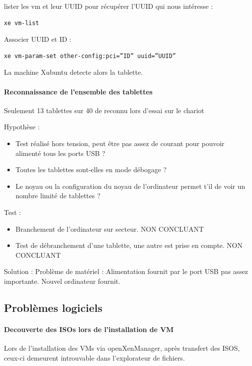 \documentclass[a4paper,12pt]{extarticle}
\begin{document}
lister les vm et leur UUID pour récupérer l’UUID qui nous intéresse :
\begin{verbatim}
xe vm-list
\end{verbatim}

Associer UUID et ID :
\begin{verbatim}
xe vm-param-set other-config:pci=”ID” uuid=”UUID”
\end{verbatim}
La machine Xubuntu detecte alors la tablette.



\paragraph{Reconnaissance de l'ensemble des tablettes\\}
Seulement 13 tablettes sur 40 de reconnu lors d'essai sur le chariot

Hypothèse :
\begin{itemize}
\item Test réalisé hors tension, peut être pas assez de courant pour pouvoir alimenté tous les ports USB ? 
\item Toutes les tablettes sont-elles en mode débogage ? 
\item Le noyau ou la configuration du noyau de l'ordinateur permet t'il de voir un nombre limité de tablettes ? \\
\end{itemize}

Test :
\begin{itemize}
\item Branchement de l'ordinateur sur secteur. NON CONCLUANT
\item Test de débranchement d'une tablette, une autre est prise en compte. NON CONCLUANT \\
\end{itemize}

Solution :
Problème de matériel : Alimentation fournit par le port USB pas assez importante. 
Nouvel ordinateur fournit.



\subsection{Problèmes logiciels}


\paragraph{Decouverte des ISOs lors de l'installation de VM\\}
Lors de l'installation des VMs via openXenManager, après transfert des ISOS, ceux-ci demeurent introuvable dans l'explorateur de fichiers.
\end{document}
